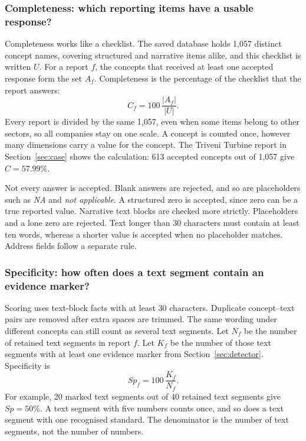 \subsubsection{Completeness: which reporting items have a usable response?}

Completeness works like a checklist. The saved database holds 1,057 distinct concept names, covering structured and narrative items alike, and this checklist is written $U$. For a report $f$, the concepts that received at least one accepted response form the set $A_f$. Completeness is the percentage of the checklist that the report answers:
\begin{equation}
C_f=100\,\frac{|A_f|}{|U|}.
\label{eq:complete}
\end{equation}
Every report is divided by the same 1,057, even when some items belong to other sectors, so all companies stay on one scale. A concept is counted once, however many dimensions carry a value for the concept. The Triveni Turbine report in Section~\ref{sec:case} shows the calculation: 613 accepted concepts out of 1,057 give $C=57.99\%$.

Not every answer is accepted. Blank answers are rejected, and so are placeholders such as \emph{NA} and \emph{not applicable}. A structured zero is accepted, since zero can be a true reported value. Narrative text blocks are checked more strictly. Placeholders and a lone zero are rejected. Text longer than 30 characters must contain at least ten words, whereas a shorter value is accepted when no placeholder matches. Address fields follow a separate rule.

\subsubsection{Specificity: how often does a text segment contain an evidence marker?}

Scoring uses text-block facts with at least 30 characters. Duplicate concept--text pairs are removed after extra spaces are trimmed. The same wording under different concepts can still count as several text segments. Let $N_f$ be the number of retained text segments in report $f$. Let $K_f$ be the number of those text segments with at least one evidence marker from Section~\ref{sec:detector}. Specificity is
\begin{equation}
Sp_f=100\,\frac{K_f}{N_f}.
\label{eq:specificity}
\end{equation}
For example, 20 marked text segments out of 40 retained text segments give $Sp=50\%$. A text segment with five numbers counts once, and so does a text segment with one recognised standard. The denominator is the number of text segments, not the number of numbers.

